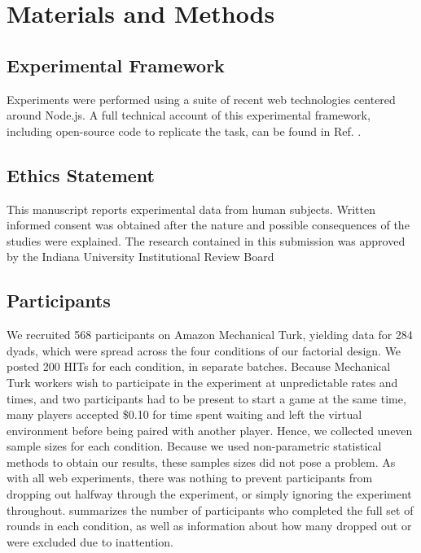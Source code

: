 \documentclass[10pt,letterpaper]{article}
\begin{document}
\section*{Materials and Methods}

\subsection*{Experimental Framework}
Experiments were performed  using a suite of recent web technologies centered around Node.js. A full technical account of this experimental framework, including open-source code to replicate the task, can be found in Ref. \cite{Hawkins15_RealTimeWebExperiments}. 

\subsection*{Ethics Statement}
This manuscript reports experimental data from human subjects. Written informed consent was obtained after the nature and possible consequences of the studies were explained. The research contained in this submission was approved by the Indiana University Institutional Review Board

\subsection*{Participants}
We recruited 568 participants on Amazon Mechanical Turk, yielding data for 284 dyads, which were spread across the four conditions of our factorial design. We posted 200 HITs for each condition, in separate batches. Because Mechanical Turk workers wish to participate in the experiment at unpredictable rates and times, and two participants had to be present to start a game at the same time, many players accepted \$0.10 for time spent waiting and left the virtual environment before being paired with another player. Hence, we collected uneven sample sizes for each condition. Because we used non-parametric statistical methods to obtain our results, these samples sizes did not pose a problem. As with all web experiments, there was nothing to prevent participants from dropping out halfway through the experiment, or simply ignoring the experiment throughout.  summarizes the number of participants who completed the full set of rounds in each condition, as well as information about how many dropped out or were excluded due to inattention. 
\end{document}
